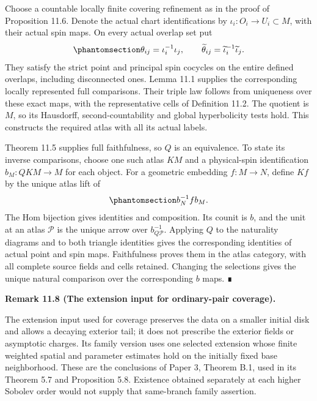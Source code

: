 \documentclass[
  english,
  11pt,
  reqno]{amsart}
\makeatletter
\newcommand{\pandocstatementheading}[1]{%
  \par\if@nobreak\else
    \addpenalty{\@beginparpenalty}%
    \addvspace{.5\baselineskip plus .2\baselineskip minus .2\baselineskip}%
  \fi
  {\normalfont\bfseries #1\par}%
  \nobreak\@afterindenttrue\@afterheading
}
\makeatother
\begin{document}
Choose a countable locally finite covering refinement as in the proof of
Proposition 11.6. Denote the actual chart identifications by
\(\iota_i:O_i\to U_i\subset M\), with their actual spin maps. On every
actual overlap set put
\begin{equation}\protect\phantomsection\label{eq:ordinary-atlas-coverage-transitions}{
\theta_{ij}=\iota_i^{-1}\iota_j,
\qquad
\widetilde\theta_{ij}
=\widetilde\iota_i^{-1}\widetilde\iota_j.
}\end{equation} They satisfy the strict point and principal spin
cocycles on the entire defined overlaps, including disconnected ones.
Lemma 11.1 supplies the corresponding locally represented full
comparisons. Their triple law follows from uniqueness over these exact
maps, with the representative cells of Definition 11.2. The quotient is
\(M\), so its Hausdorff, second-countability and global hyperbolicity
tests hold. This constructs the required atlas with all its actual
labels.

Theorem 11.5 supplies full faithfulness, so \(Q\) is an equivalence. To
state its inverse comparisons, choose one such atlas \(K M\) and a
physical-spin identification \(b_M:QK M\to M\) for each object. For a
geometric embedding \(f:M\to N\), define \(Kf\) by the unique atlas lift
of
\begin{equation}\protect\phantomsection\label{eq:ordinary-atlas-inverse-arrow}{
b_N^{-1} f b_M.
}\end{equation} The Hom bijection gives identities and composition. Its
counit is \(b\), and the unit at an atlas \(\mathcal P\) is the unique
arrow over \(b_{Q\mathcal P}^{-1}\). Applying \(Q\) to the naturality
diagrams and to both triangle identities gives the corresponding
identities of actual point and spin maps. Faithfulness proves them in
the atlas category, with all complete source fields and cells retained.
Changing the selections gives the unique natural comparison over the
corresponding \(b\) maps. ∎

\pandocstatementheading{\protect{}\label{rem:ordinary-atlas-dependency-scope}Remark 11.8 (The extension input for ordinary-pair coverage).}

The extension input used for coverage preserves the data on a smaller
initial disk and allows a decaying exterior tail; it does not prescribe
the exterior fields or asymptotic charges. Its family version uses one
selected extension whose finite weighted spatial and parameter estimates
hold on the initially fixed base neighborhood. These are the conclusions
of Paper 3, Theorem B.1, used in its Theorem 5.7 and Proposition 5.8.
Existence obtained separately at each higher Sobolev order would not
supply that same-branch family assertion.
\end{document}
